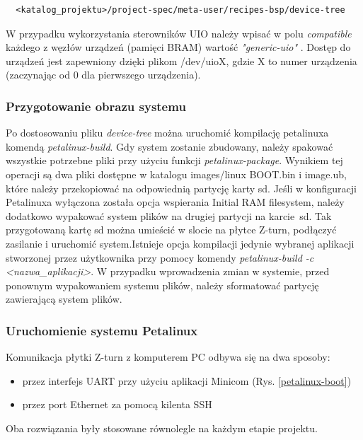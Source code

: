 \begin{verbatim}
  <katalog_projektu>/project-spec/meta-user/recipes-bsp/device-tree
\end{verbatim}
W przypadku wykorzystania sterowników UIO należy wpisać w polu \emph{compatible} każdego z węzłów urządzeń (pamięci 
BRAM) wartość \emph{"generic-uio"} \cite{uio-device-tree}. Dostęp do urządzeń jest zapewniony dzięki plikom /dev/uioX, 
gdzie X to numer urządzenia (zaczynając od 0 dla pierwszego urządzenia).

\subsubsection{Przygotowanie obrazu systemu}

Po dostosowaniu pliku \emph{device-tree} można uruchomić kompilację petalinuxa komendą \emph{petalinux-build}.
Gdy system zostanie zbudowany, należy spakować wszystkie potrzebne pliki przy użyciu funkcji \emph{petalinux-package}.
Wynikiem tej operacji są dwa pliki dostępne w katalogu images/linux BOOT.bin i image.ub, które należy przekopiować na
odpowiednią partycję karty sd. Jeśli w konfiguracji Petalinuxa wyłączona została opcja wspierania Initial RAM
filesystem, należy dodatkowo wypakować system plików na drugiej partycji na karcie~sd. Tak przygotowaną kartę sd można
umieścić w slocie na płytce Z-turn, podłączyć zasilanie i uruchomić system.Istnieje opcja kompilacji jedynie wybranej 
aplikacji stworzonej przez użytkownika przy pomocy komendy \emph{petalinux-build -c <nazwa\_aplikacji>}. W przypadku 
wprowadzenia zmian w systemie, przed ponownym wypakowaniem systemu plików, należy sformatować partycję zawierającą 
system plików. 

\subsubsection{Uruchomienie systemu Petalinux}

Komunikacja płytki Z-turn z komputerem PC odbywa się na dwa sposoby:
\begin{itemize}
  \item przez interfejs UART przy użyciu aplikacji Minicom (Rys. \ref{petalinux-boot})
  \item przez port Ethernet za pomocą kilenta SSH 
\end{itemize}
Oba rozwiązania były stosowane równolegle na każdym etapie projektu. 

